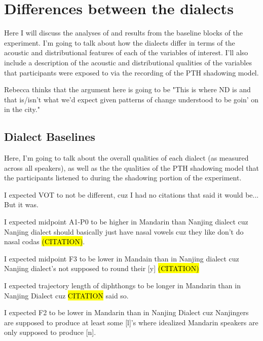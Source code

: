 \chapter{Differences between the dialects}
\label{baselinechapter}
Here I will discuss the analyses of and results from the baseline blocks of the experiment. I'm going to talk about how the dialects differ in terms of the acoustic and distributional features of each of the variables of interest. I'll also include a description of the acoustic and distributional qualities of the variables that participants were exposed to via the recording of the PTH shadowing model.

Rebecca thinks that the argument here is going to be "This is where ND is and that is/isn't what we'd expect given patterns of change understood to be goin' on in the city."

\section{Dialect Baselines}
\label{sec:baselines}

Here, I'm going to talk about the overall qualities of each dialect (as measured across all speakers), as well as the the qualities of the PTH shadowing model that the participants listened to during the shadowing portion of the experiment. %

I expected VOT to not be different, cuz I had no citations that said it would be... But it was.

I expected midpoint A1-P0 to be higher in Mandarin than Nanjing dialect cuz Nanjing dialect should basically just have nasal vowels cuz they like don't do nasal codas \hl{(CITATION)}.

I expected midpoint F3 to be lower in Mandain than in Nanjing dialect cuz Nanjing dialect's not supposed to round their [y] \hl{(CITATION)}

I expected trajectory length of \textipa{[iE]} diphthongs to be longer in Mandarin than in Nanjing Dialect cuz \hl{CITATION} said so.

I expected F2 to be lower in Mandarin than in Nanjing Dialect cuz Nanjingers are supposed to produce at least some [l]'s \citep{bao1980sixty} where idealized Mandarin speakers are only supposed to produce [n].

